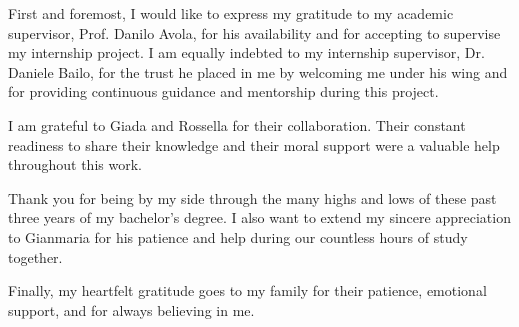 
\dedication{To my family, colleagues, and friends, by my side today or carved into my memories,\\
whose support is etched in the surface of every page,\\
shaping every step of this path.}

\begin{acknowledgments}
\upshape
First and foremost, I would like to express my gratitude to my academic supervisor, Prof. Danilo Avola, for his availability and for accepting to supervise my internship project. I am equally indebted to my internship supervisor, Dr. Daniele Bailo, for the trust he placed in me by welcoming me under his wing and for providing continuous guidance and mentorship during this project.

I am grateful to Giada and Rossella for their collaboration. Their constant readiness to share their knowledge and their moral support were a valuable help throughout this work.

 Thank you for being by my side through the many highs and lows of these past three years of my bachelor's degree. I also want to extend my sincere appreciation to Gianmaria for his patience and help during our countless hours of study together.

Finally, my heartfelt gratitude goes to my family for their patience, emotional support, and for always believing in me.
\end{acknowledgments}

